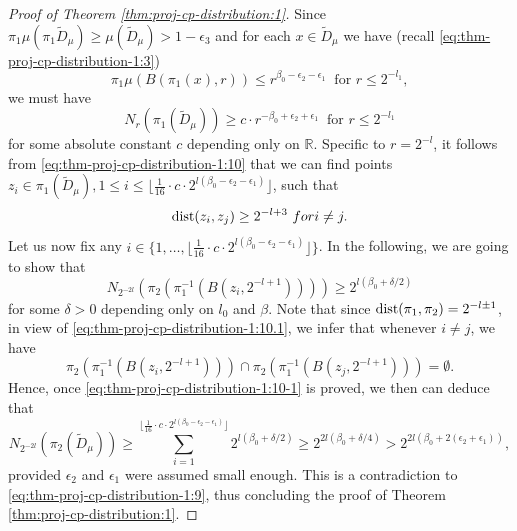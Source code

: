 \documentclass[10pt,a4paper]{amsart}
\DeclareMathOperator{\dist}{{\rm dist}}
\def\R{\mathbb R}
\begin{document}
\begin{proof}[Proof of Theorem \ref{thm:proj-cp-distribution:1}]
Since $\pi_1\mu(\pi_1\tilde{D}_\mu)\ge \mu(\tilde{D}_\mu)>1-\epsilon_3$ and for each $x\in \tilde{D}_\mu$ we have (recall \eqref{eq:thm-proj-cp-distribution-1:3}) 
\[
\pi_1\mu(B(\pi_1(x),  r)) \le r^{\beta_0-\epsilon_2-\epsilon_1} \  \textrm{ for } r\le 2^{-l_1}, 
\]
we must have
\begin{equation}\label{eq:thm-proj-cp-distribution-1:10}
N_{r}(\pi_1(\tilde{D}_\mu)) \ge c \cdot  r^{-\beta_0+\epsilon_2+ \epsilon_1} \ \textrm{ for } r\le 2^{-l_1}
\end{equation}
for some absolute constant $c$ depending only on $\R$.  Specific to $r=2^{-l}$,  it follows from \eqref{eq:thm-proj-cp-distribution-1:10} that we can find points $z_i\in \pi_1(\tilde{D}_\mu),  1\le i\le \lfloor\frac{1}{16}\cdot c \cdot  2^{l(\beta_0-\epsilon_2- \epsilon_1)}  \rfloor$, such that 
\begin{equation}\label{eq:thm-proj-cp-distribution-1:10.1}
\dist(z_i,z_j)\ge 2^{-l+3} \ \textrm{ for } i\neq  j.
\end{equation}
Let us now fix any $i\in \{1,\ldots,  \lfloor\frac{1}{16}\cdot c \cdot  2^{l(\beta_0-\epsilon_2- \epsilon_1)}  \rfloor\}$.  
In the following, we are going to show that 
\begin{equation}\label{eq:thm-proj-cp-distribution-1:10-1}
N_{2^{-2l}}\left( \pi_2\left( \pi_1^{-1}(B(z_i,2^{-l+1})) \right) \right) \ge 2^{l(\beta_0+\delta/2)}
\end{equation}
for some $\delta>0$ depending only on $l_0$ and $\beta$.
Note that since  $\dist(\pi_1,\pi_2)= 2^{-l\pm 1}$,  in view of \eqref{eq:thm-proj-cp-distribution-1:10.1}, we infer that  whenever $i\neq j$, we have 
\[
 \pi_2\left( \pi_1^{-1}(B(z_i,2^{-l+1})) \right) \cap  \pi_2\left( \pi_1^{-1}(B(z_j,2^{-l+1})) \right) = \emptyset.
\]
Hence, once \eqref{eq:thm-proj-cp-distribution-1:10-1} is proved,  we then can deduce that 
\[
N_{2^{-2l}}\left( \pi_2(\tilde{D}_\mu)\right) \ge \sum_{i=1}^{\lfloor\frac{1}{16}\cdot c \cdot  2^{l(\beta_0-\epsilon_2- \epsilon_1)}  \rfloor} 2^{l(\beta_0+\delta/2)} \ge 2^{2l(\beta_0+\delta/4)} >  2^{2l(\beta_0+2(\epsilon_2+\epsilon_1))},
\]
provided $\epsilon_2 $ and $\epsilon_1$ were assumed small enough.  This is a contradiction to \eqref{eq:thm-proj-cp-distribution-1:9}, thus concluding the proof of Theorem \ref{thm:proj-cp-distribution:1}.


\end{proof}
\end{document}
